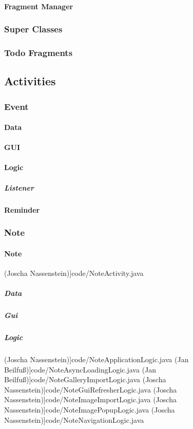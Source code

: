 		\paragraph{Fragment Manager}
	\subsubsection{Super Classes}
	\subsubsection{Todo Fragments}

\subsection{Activities}
	\subsubsection{Event}
		\paragraph{Data}
		\paragraph{GUI}
		\paragraph{Logic}
			\subparagraph{Listener}
		\paragraph{Reminder}
	\subsubsection{Note}
		\paragraph{Note}
 (Joscha Nassenstein)]{code/NoteActivity.java}
			\subparagraph{Data}
			\subparagraph{Gui}
			\subparagraph{Logic}
 (Joscha Nassenstein)]{code/NoteApplicationLogic.java}
 (Jan Beilfuß)]{code/NoteAsyncLoadingLogic.java}
 (Jan Beilfuß)]{code/NoteGalleryImportLogic.java}
 (Joscha Nassenstein)]{code/NoteGuiRefresherLogic.java}
 (Joscha Nassenstein)]{code/NoteImageImportLogic.java}
 (Joscha Nassenstein)]{code/NoteImagePopupLogic.java}
 (Joscha Nassenstein)]{code/NoteNavigationLogic.java}


